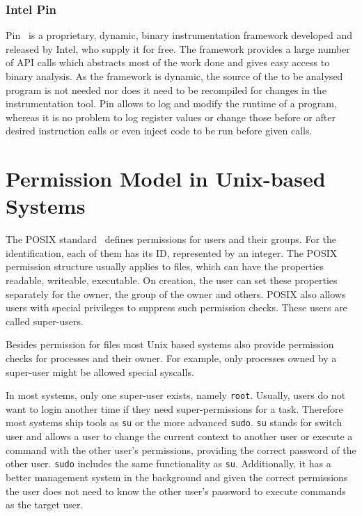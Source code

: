 
\subsubsection{Intel Pin}

Pin~\cite{pintool} is a proprietary, dynamic, binary instrumentation framework
developed and released by Intel, who supply it for free. The framework provides
a large number of API calls which abstracts most of the work done and gives easy
access to binary analysis. As the framework is dynamic, the source of the to be
analysed program is not needed nor does it need to be recompiled for changes in
the instrumentation tool. Pin allows to log and modify the runtime of a program,
whereas it is no problem to log register values or change those before or after
desired instruction calls or even inject code to be run before given calls.

\section{Permission Model in Unix-based Systems}

The POSIX standard~ defines permissions for users
and their groups. For the identification, each of them has its ID, represented
by an integer. The POSIX permission structure usually applies to files, which
can have the properties readable, writeable, executable. On creation, the user
can set these properties separately for the owner, the group of the owner and
others. POSIX also allows users with special privileges to suppress such
permission checks. These users are called super-users.

Besides permission for files most Unix based systems also provide permission
checks for processes and their owner. For example, only processes owned by a
super-user might be allowed special syscalls.

In most systems, only one super-user exists, namely \texttt{root}. Usually,
users do not want to login another time if they need super-permissions for a
task. Therefore most systems ship tools as \texttt{su} or the more advanced
\texttt{sudo}. \texttt{su} stands for switch user and allows a user to change
the current context to another user or execute a command with the other user's
permissions, providing the correct password of the other user. \texttt{sudo}
includes the same functionality as \texttt{su}. Additionally, it has a better
management system in the background and given the correct permissions the user
does not need to know the other user's password to execute commands as the
target user.

